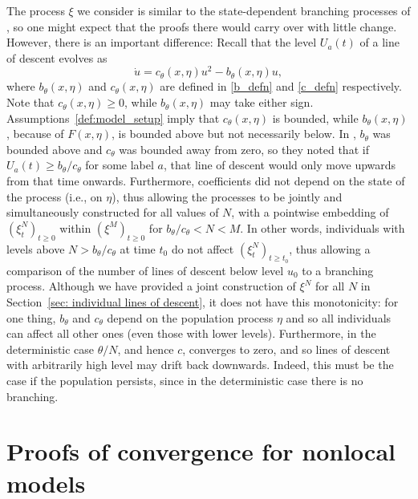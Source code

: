 \documentclass[EJP]{ejpecp} %
\newcommand{\lp}{\xi}              %
\newcommand{\citet}[1]{\cite{#1}}
\begin{document}
\begin{remark} \label{remark_on_branching}
The process $\lp$ we consider is similar to the state-dependent branching processes 
of \citet{kurtz/rodrigues:2011}, so one might expect that the proofs there would carry over with little change.
However, there is an important difference:
Recall that the level $U_a(t)$ of a line of descent evolves as
\begin{equation} \label{eqn:u_evolution}
\dot u = c_\theta(x, \eta) u^2 - b_\theta(x, \eta) u,
\end{equation}
where $b_\theta(x, \eta)$ and $c_\theta(x, \eta)$ are defined in \eqref{b_defn}
and \eqref{c_defn} respectively.
Note that $c_\theta(x, \eta) \ge 0$, while $b_\theta(x, \eta)$ may take either sign.
Assumptions~\ref{def:model_setup} imply that $c_\theta(x, \eta)$ is bounded,
while $b_\theta(x, \eta)$, because of $F(x, \eta)$, is bounded above but not necessarily below.
In \citet{kurtz/rodrigues:2011}, $b_\theta$ was bounded above and $c_\theta$ was bounded away from zero,
so they noted that if $U_a(t) \ge b_\theta/c_\theta$ for some label $a$,
that line of descent would only move upwards from that time onwards.
Furthermore, coefficients did not depend on the state of the process (i.e., on $\eta$),
thus allowing the processes to be jointly and simultaneously constructed
for all values of $N$, with a pointwise embedding
of $(\lp^N_t)_{t \ge 0}$ within $(\lp^{M})_{t \ge 0}$ for $b_\theta/c_\theta < N < M$.
In other words, individuals with levels above $N > b_\theta/c_\theta$ at time $t_0$
do not affect $(\lp^N_t)_{t \ge t_0}$,
thus allowing a comparison of the number of lines of descent below level $u_0$
to a branching process.
Although we have provided a
joint construction of $\lp^N$ for all $N$ in Section~\ref{sec: individual lines of descent},
it does not have this monotonicity:
for one thing, $b_\theta$ and $c_\theta$ depend on the population process $\eta$
and so all individuals can affect all other ones (even those with lower levels).
Furthermore, in the deterministic case $\theta/N$, and hence $c$, converges to zero,
and so lines of descent with arbitrarily high level may drift back downwards.
Indeed, this must be the case if the population persists,
since in the deterministic case there is no branching.
\end{remark}


\section{Proofs of convergence for nonlocal models}
\label{sec:proofs}
\end{document}

